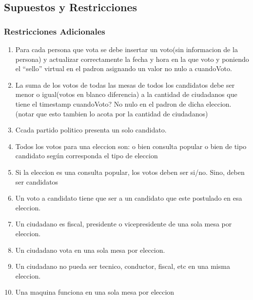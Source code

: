 \subsection{Supuestos y Restricciones}

\subsubsection{Restricciones Adicionales}

\begin{enumerate}
	\item  Para cada persona que vota se debe insertar un voto(sin informacion de la persona) y actualizar correctamente la fecha y hora en la que voto y poniendo el “sello” virtual en el padron asignando un valor no nulo a cuandoVoto.
	\item  La suma de los votos de todas las mesas de todos los candidatos debe ser menor o igual(votos en blanco diferencia) a la cantidad de ciudadanos que tiene el timestamp cuandoVoto? No nulo en el padron de dicha eleccion. (notar que esto tambien lo acota por la cantidad de ciudadanos)
	\item  Ccada partido politico presenta un solo candidato.
	\item  Todos los votos para una eleccion son: o bien consulta popular o bien de tipo candidato según corresponda el tipo de eleccion
	\item Si la eleccion es una consulta popular, los votos deben ser si/no. Sino, deben ser candidatos
	\item Un voto a candidato tiene que ser a un candidato que este postulado en esa eleccion.
	\item Un ciudadano es fiscal, presidente o vicepresidente de una sola mesa por eleccion.
	\item Un ciudadano vota en una sola mesa por eleccion.
	\item Un ciudadano no pueda ser tecnico, conductor, fiscal, etc en una misma eleccion.
	\item Una maquina funciona en una sola mesa por eleccion
\end{enumerate}
